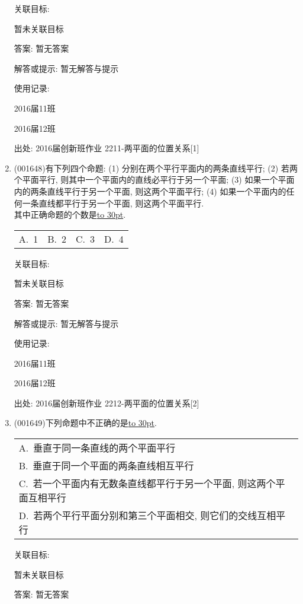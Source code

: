 \documentclass[10pt,a4paper]{article}
\newcommand{\blank}[1]{\underline{\hbox to #1pt{}}}
\newcommand{\onech}[4]{\par\begin{tabular}{p{.9\textwidth}}
A.~#1\\
B.~#2\\
C.~#3\\
D.~#4
\end{tabular}}
\newcommand{\fourch}[4]{\par\begin{tabular}{p{.23\textwidth}p{.23\textwidth}p{.23\textwidth}p{.23\textwidth}}
A.~#1 &B.~#2& C.~#3& D.~#4
\end{tabular}}
\begin{document}
\begin{enumerate}[1.]
关联目标:

暂未关联目标

答案: 暂无答案

解答或提示: 暂无解答与提示

使用记录:

2016届11班							

2016届12班							


出处: 2016届创新班作业	2211-两平面的位置关系[1]
\item { (001648)}有下列四个命题: (1) 分别在两个平行平面内的两条直线平行; (2) 若两个平面平行, 则其中一个平面内的直线必平行于另一个平面; (3) 如果一个平面内的两条直线平行于另一个平面, 则这两个平面平行; (4) 如果一个平面内的任何一条直线都平行于另一个平面, 则这两个平面平行.\\ 
其中正确命题的个数是\blank{30}.\\ 
\fourch{1}{2}{3}{4}


关联目标:

暂未关联目标

答案: 暂无答案

解答或提示: 暂无解答与提示

使用记录:

2016届11班	

2016届12班	


出处: 2016届创新班作业	2212-两平面的位置关系[2]
\item { (001649)}下列命题中不正确的是\blank{30}.\\ 
\onech{垂直于同一条直线的两个平面平行}{垂直于同一个平面的两条直线相互平行}{若一个平面内有无数条直线都平行于另一个平面, 则这两个平面互相平行}{若两个平行平面分别和第三个平面相交, 则它们的交线互相平行}


关联目标:

暂未关联目标

答案: 暂无答案


\end{enumerate}
\end{document}
